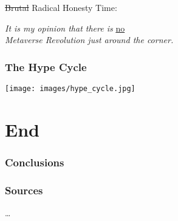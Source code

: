 \documentclass[aspectratio=169,x11names]{beamer}
\begin{document}
\begin{frame}
\Large
\sout{Brutal} Radical Honesty Time:\bigskip\bigskip

\begin{center}
\emph{It is my opinion that there is} \underline{no}\\
\emph{Metaverse Revolution just around the corner.}
\end{center}
\end{frame}

\begin{frame}
\frametitle{The Hype Cycle}
\begin{center}
\texttt{[image: images/hype\_cycle.jpg]} 
\end{center}
\end{frame}

\section{End}
{
    
    \begin{frame}
	\frametitle{Conclusions}
	\end{frame}
    
    \begin{frame}[fragile]
    \frametitle{Sources}
    \dots
    \vfill
    \end{frame}
}
\end{document}
